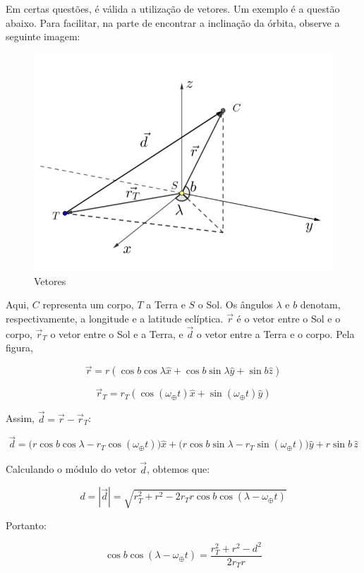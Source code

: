 \documentclass[11pt]{article}
\begin{document}
\begin{psidea}{}{}
    Em certas questões, é válida a utilização de vetores. Um exemplo é a questão abaixo. Para facilitar, na parte de encontrar a inclinação da órbita, observe a seguinte imagem:

    \begin{figure}[H]
        \centering
        \includegraphics[width=0.7\linewidth]{imagens/vetores ecliptica.png}
        \caption{Vetores}
    \end{figure}

    Aqui, \(C\) representa um corpo, \(T\) a Terra e \(S\) o Sol. Os ângulos \(\lambda\) e \(b\) denotam, respectivamente, a longitude e a latitude eclíptica. \(\vec{r}\) é o vetor entre o Sol e o corpo, \(\vec{r}_T\) o vetor entre o Sol e a Terra, e \(\vec{d}\) o vetor entre a Terra e o corpo.
    Pela figura,

    \[\vec{r} = r(\cos b\cos\lambda \hat{x}+ \cos b \sin\lambda \hat{y} + \sin b \hat{z})\]

    \[\vec{r}_T = r_T(\cos(\omega_\oplus t)\hat{x}+\sin(\omega_\oplus t)\hat{y})\]

    Assim, \(\vec{d}=\vec{r}-\vec{r}_T\):

    \[
    \vec{d} = \big(r \cos b \cos \lambda - r_T \cos (\omega_\oplus t)\big) \hat{x} 
    + \big(r \cos b \sin \lambda - r_T \sin (\omega_\oplus t)\big) \hat{y} 
    + r \sin b \, \hat{z}
    \]

    Calculando o módulo do vetor \(\vec{d}\), obtemos que:

    \[
    d = |\vec{d}| = \sqrt{r_T^2 + r^2 - 2 r_T r \cos b \cos (\lambda - \omega_\oplus t)}
    \]

    Portanto:

    \[
    \boxed{\cos b \cos (\lambda - \omega_\oplus t) = \frac{r_T^2 + r^2 - d^2}{2 r_T r}}
    \]
\end{psidea}
\end{document}
